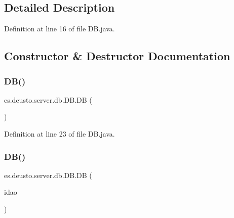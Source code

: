 \subsection{Detailed Description}


Definition at line 16 of file D\+B.\+java.



\subsection{Constructor \& Destructor Documentation}
\mbox{\label{classes_1_1deusto_1_1server_1_1db_1_1_d_b_ab53f32f36928ba9aa3ddff65fce395dc}} 
\subsubsection{\texorpdfstring{D\+B()}{DB()}\hspace{0.1cm}{\footnotesize\ttfamily [1/2]}}
{\footnotesize\ttfamily es.\+deusto.\+server.\+db.\+D\+B.\+DB (\begin{DoxyParamCaption}{ }\end{DoxyParamCaption})}



Definition at line 23 of file D\+B.\+java.

\mbox{\label{classes_1_1deusto_1_1server_1_1db_1_1_d_b_a8c85804ab042af947fd1a749ff42fd0d}} 
\subsubsection{\texorpdfstring{D\+B()}{DB()}\hspace{0.1cm}{\footnotesize\ttfamily [2/2]}}
{\footnotesize\ttfamily es.\+deusto.\+server.\+db.\+D\+B.\+DB (\begin{DoxyParamCaption}\item[{\hyperlink{interfacees_1_1deusto_1_1server_1_1db_1_1dao_1_1_i_d_a_o}{I\+D\+AO}}]{idao }\end{DoxyParamCaption})}



